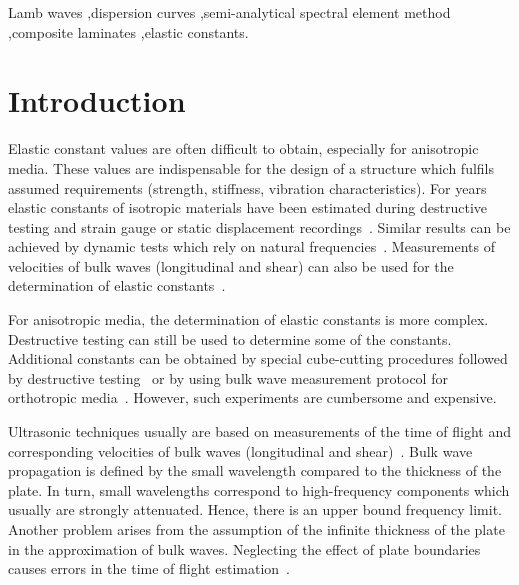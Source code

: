 \documentclass[preprint,12pt]{elsarticle}
\begin{document}
\begin{frontmatter}
		\begin{keyword}
			Lamb waves \sep dispersion curves \sep semi-analytical spectral element method \sep composite laminates \sep elastic constants.
			
			
		\end{keyword}
		
	\end{frontmatter}
	
	
	\section{Introduction}
	Elastic constant values are often difficult to obtain, especially for anisotropic media. These values are indispensable for the design of a structure which fulfils assumed requirements (strength, stiffness, vibration characteristics). For years elastic constants of isotropic materials have been estimated during destructive testing and strain gauge or static displacement recordings~\cite{Wang2000}. Similar results can be achieved by dynamic tests which rely on natural frequencies~\cite{Wang2000a, Wesolowski2009,Beluch2014}. Measurements of velocities of bulk waves (longitudinal and shear) can also be used for the determination of elastic constants~\cite{Rose1999}.
	
	For anisotropic media, the determination of elastic constants is more complex. Destructive testing can still be used to determine some of the constants. Additional constants can be obtained by special cube-cutting procedures followed by destructive testing~\cite{Rose1991} or by using bulk wave measurement protocol for orthotropic media~\cite{Rose1999}. However, such experiments are cumbersome and expensive. 
	
	Ultrasonic techniques usually are based on measurements of the time of flight and corresponding velocities of bulk waves (longitudinal and shear)~\cite{Castellano2014}.
	Bulk wave propagation is defined by the small wavelength compared to the thickness of the plate. 
	In turn, small wavelengths correspond to high-frequency components which usually are strongly attenuated. 
	Hence, there is an upper bound frequency limit.
	Another problem arises from the assumption of the infinite thickness of the plate in the approximation of bulk waves. 
	Neglecting the effect of plate boundaries causes errors in the time of flight estimation~\cite{Martens2017}. 
	
\end{document}
